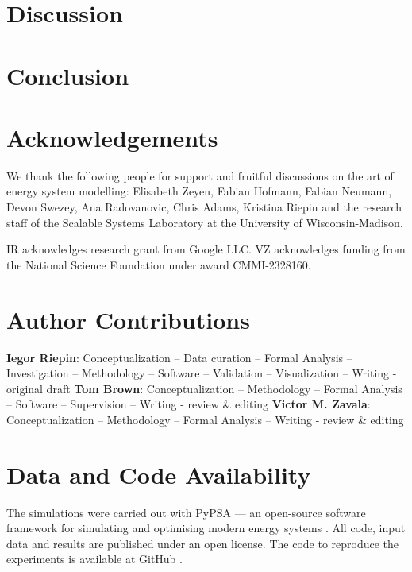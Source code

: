 \documentclass[11pt, 5p, nopreprintline]{elsarticle}
\begin{document}
\section{Discussion}
\label{sec:discussion}


\section{Conclusion}
\label{sec:conclusion}


\section*{Acknowledgements}

We thank the following people for support and fruitful discussions on the art of energy system modelling: Elisabeth Zeyen, Fabian Hofmann, Fabian Neumann, Devon Swezey, Ana Radovanovic, Chris Adams, Kristina Riepin and the research staff of the Scalable Systems Laboratory at the University of Wisconsin-Madison.

IR acknowledges research grant from Google LLC. VZ acknowledges funding from the National Science Foundation under award CMMI-2328160.

\section*{Author Contributions}


\textbf{Iegor Riepin}:
Conceptualization --
Data curation --
Formal Analysis --
Investigation --
Methodology --
Software --
Validation --
Visualization --
Writing - original draft
\textbf{Tom Brown}:
Conceptualization --
Methodology --
Formal Analysis --
Software --
Supervision --
Writing - review \& editing
\textbf{Victor M. Zavala}:
Conceptualization --
Methodology --
Formal Analysis --
Writing - review \& editing


\section*{Data and Code Availability}
\label{sec:code}

The simulations were carried out with PyPSA --- an open-source software framework for simulating and optimising modern energy systems \cite{brownPyPSAPythonPower2018}.
All code, input data and results are published under an open license. The code to reproduce the experiments is available at GitHub \cite{github-spacetime}.
\end{document}
